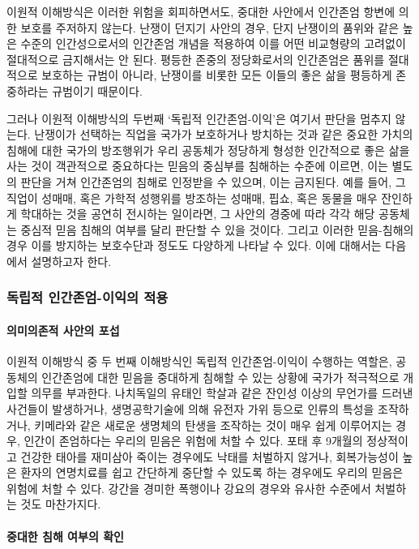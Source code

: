 이원적 이해방식은 이러한 위험을 회피하면서도, 중대한 사안에서 인간존엄 항변에 의한 보호를 주저하지 않는다. 난쟁이 던지기 사안의 경우, 단지 난쟁이의 품위와 같은 높은 수준의 인간성으로서의 인간존엄 개념을 적용하여 이를 어떤 비교형량의 고려없이 절대적으로 금지해서는 안 된다. 평등한 존중의 정당화로서의 인간존엄은 품위를 절대적으로 보호하는 규범이 아니라, 난쟁이를 비롯한 모든 이들의 좋은 삶을 평등하게 존중하라는 규범이기 때문이다.

그러나 이원적 이해방식의 두번째 `독립적 인간존엄-이익'은 여기서 판단을 멈추지 않는다. 난쟁이가 선택하는 직업을 국가가 보호하거나 방치하는 것과 같은 중요한 가치의 침해에 대한 국가의 방조행위가 우리 공동체가 정당하게 형성한 인간적으로 좋은 삶을 사는 것이 객관적으로 중요하다는 믿음의 중심부를 침해하는 수준에 이르면, 이는 별도의 판단을 거쳐 인간존엄의 침해로 인정받을 수 있으며, 이는 금지된다. 예를 들어, 그 직업이 성매매, 혹은 가학적 성행위를 방조하는 성매매, 핍쇼, 혹은 동물을 매우 잔인하게 학대하는 것을 공연히 전시하는 일이라면, 그 사안의 경중에 따라 각각 해당 공동체는 중심적 믿음 침해의 여부를 달리 판단할 수 있을 것이다. 그리고 이러한 믿음-침해의 경우 이를 방지하는 보호수단과 정도도 다양하게 나타날 수 있다. 이에 대해서는 다음에서 설명하고자 한다.

\subsubsection{독립적 인간존엄-이익의 적용}

\paragraph{의미의존적 사안의 포섭}

이원적 이해방식 중 두 번째 이해방식인 독립적 인간존엄-이익이 수행하는 역할은, 공동체의 인간존엄에 대한 믿음을 중대하게 침해할 수 있는 상황에 국가가 적극적으로 개입할 의무를 부과한다. 나치독일의 유태인 학살과 같은 잔인성 이상의 무언가를 드러낸 사건들이 발생하거나, 생명공학기술에 의해 유전자 가위 등으로 인류의 특성을 조작하거나, 키메라와 같은 새로운 생명체의 탄생을 조작하는 것이 매우 쉽게 이루어지는 경우, 인간이 존엄하다는 우리의 믿음은 위험에 처할 수 있다. 포태 후 9개월의 정상적이고 건강한 태아를 재미삼아 죽이는 경우에도 낙태를 처벌하지 않거나, 회복가능성이 높은 환자의 연명치료를 쉽고 간단하게 중단할 수 있도록 하는 경우에도 우리의 믿음은 위험에 처할 수 있다. 강간을 경미한 폭행이나 강요의 경우와 유사한 수준에서 처벌하는 것도 마찬가지다.

\paragraph{중대한 침해 여부의 확인}

